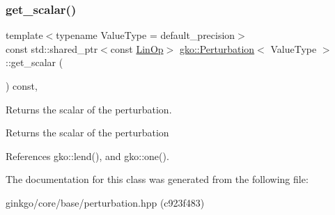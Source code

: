 \subsubsection{\texorpdfstring{get\+\_\+scalar()}{get\_scalar()}}
{\footnotesize\ttfamily template$<$typename Value\+Type  = default\+\_\+precision$>$ \\
const std\+::shared\+\_\+ptr$<$const \hyperlink{classgko_1_1LinOp}{Lin\+Op}$>$ \hyperlink{classgko_1_1Perturbation}{gko\+::\+Perturbation}$<$ Value\+Type $>$\+::get\+\_\+scalar (\begin{DoxyParamCaption}{ }\end{DoxyParamCaption}) const\hspace{0.3cm}{\ttfamily [inline]}, {\ttfamily [noexcept]}}



Returns the scalar of the perturbation. 

\begin{DoxyReturn}{Returns}
the scalar of the perturbation 
\end{DoxyReturn}


References gko\+::lend(), and gko\+::one().



The documentation for this class was generated from the following file\+:\begin{DoxyCompactItemize}
\item 
ginkgo/core/base/perturbation.\+hpp (c923f483)\end{DoxyCompactItemize}

